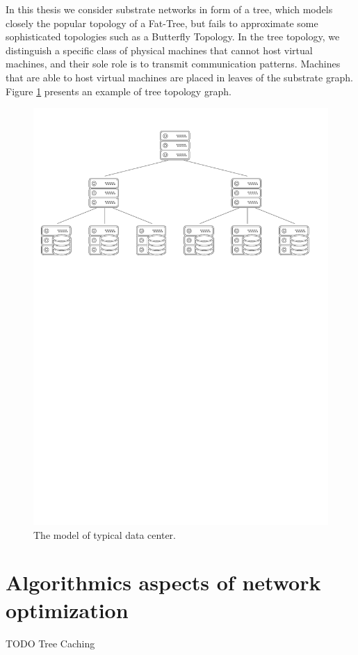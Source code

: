In this thesis we consider substrate networks in form of a tree, which models closely the popular topology of a Fat-Tree, but fails to approximate some sophisticated topologies such as a Butterfly Topology.
In the tree topology, we distinguish a specific class of physical machines that cannot host virtual machines, and their sole role is to transmit communication patterns.
Machines that are able to host virtual machines are placed in leaves of the substrate graph.
Figure \ref{fig:tree-topology} presents an example of tree topology graph.


\begin{figure}[th]
\centering
\includegraphics[width=0.79\columnwidth]{figs/tree-topology.pdf}
\caption{The model of typical data center.}\label{fig:tree-topology}
\vspace{-1em}
\end{figure}

\section{Algorithmics aspects of network optimization}

TODO Tree Caching

